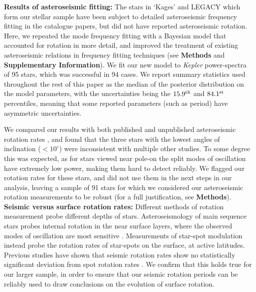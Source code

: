 \documentclass[12pt]{article}
\newcommand{\kepler}{\emph{Kepler}\xspace}
\begin{document}
\textbf{Results of asteroseismic fitting:} The stars in `Kages' and LEGACY which form our stellar sample have been subject to detailed asteroseismic frequency fitting in the catalogue papers, but did not have reported asteroseismic rotation. Here, we repeated the mode frequency fitting with a Bayesian model that accounted for rotation in more detail, and improved the treatment of existing asteroseismic relations in frequency fitting techniques (see \textbf{Methods} and \textbf{Supplementary Information}). We fit our new model to \kepler power-spectra of 95 stars, which was successful in 94 cases. We report summary statistics used throughout the rest of this paper as the median of the posterior distribution on the model parameters, with the uncertainties being the $15.9^{\rm th}$ and $84.1^{\rm st}$ percentiles, meaning that some reported parameters (such as period) have asymmetric uncertainties.

We compared our results with both published and unpublished asteroseismic rotation rates \cite{nielsen+2015,davies+2015,davies+2016, lund+2017, benomar+2018}, and found that the three stars with the lowest angles of inclination ($< 10^\circ$) were inconsistent with multiple other studies. To some degree this was expected, as  for stars viewed near pole-on the split modes of oscillation have extremely low power, making them hard to detect reliably. We flagged our rotation rates for these stars, and did not use them in the next steps in our analysis, leaving a sample of 91 stars for which we considered our asteroseismic rotation measurements to be robust (for a full justification, see \textbf{Methods}).\\

\textbf{Seismic versus surface rotation rates:} Different methods of rotation measurement probe different depths of stars. Asteroseismology of main sequence stars probes internal rotation in the near surface layers, where the observed modes of oscillation are most sensitive \cite{lund+2014}. Measurements of star-spot modulation instead probe the rotation rates of star-spots on the surface, at active latitudes. Previous studies have shown that seismic rotation rates show no statistically significant deviation from spot rotation rates \cite{nielsen+2015, benomar+2015}. We confirm that this holds true for our larger sample, in order to ensure that our seismic rotation periods can be reliably used to draw conclusions on the evolution of surface rotation.
\end{document}
